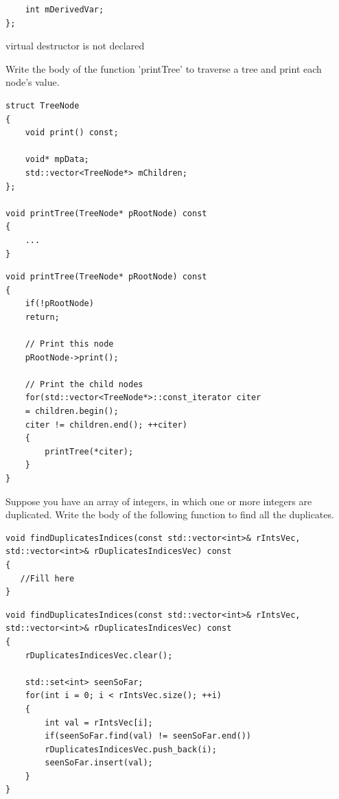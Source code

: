 \documentclass{exam}
\begin{document}
\begin{questions}
\begin{lstlisting}
	int mDerivedVar;
};
\end{lstlisting}
\begin{solution}[.2in]
virtual destructor is not declared
\end{solution}

\question Write the body of the function 'printTree' to traverse a tree and print each node’s value.
\begin{lstlisting}
struct TreeNode
{
	void print() const;
	
	void* mpData;
	std::vector<TreeNode*> mChildren;
};

void printTree(TreeNode* pRootNode) const
{
	...
}
\end{lstlisting}
\begin{solution}[.2in]
\begin{lstlisting}
void printTree(TreeNode* pRootNode) const
{
	if(!pRootNode)
	return;
	
	// Print this node
	pRootNode->print();
	
	// Print the child nodes
	for(std::vector<TreeNode*>::const_iterator citer
	= children.begin();
	citer != children.end(); ++citer)
	{
		printTree(*citer);
	}
}
\end{lstlisting}
\end{solution}

\question Suppose you have an array of integers, in which one or more integers are duplicated.
Write the body of the following function to find all the duplicates.
\begin{lstlisting}
void findDuplicatesIndices(const std::vector<int>& rIntsVec, 
std::vector<int>& rDuplicatesIndicesVec) const
{
   //Fill here
}
\end{lstlisting}
\begin{solution}[.2in]
\begin{lstlisting}
void findDuplicatesIndices(const std::vector<int>& rIntsVec,
std::vector<int>& rDuplicatesIndicesVec) const
{
	rDuplicatesIndicesVec.clear();
	
	std::set<int> seenSoFar;
	for(int i = 0; i < rIntsVec.size(); ++i)
	{
		int val = rIntsVec[i];
		if(seenSoFar.find(val) != seenSoFar.end())
		rDuplicatesIndicesVec.push_back(i);
		seenSoFar.insert(val);
	}
}
\end{lstlisting}
\end{solution}


\end{questions}
\end{document}
